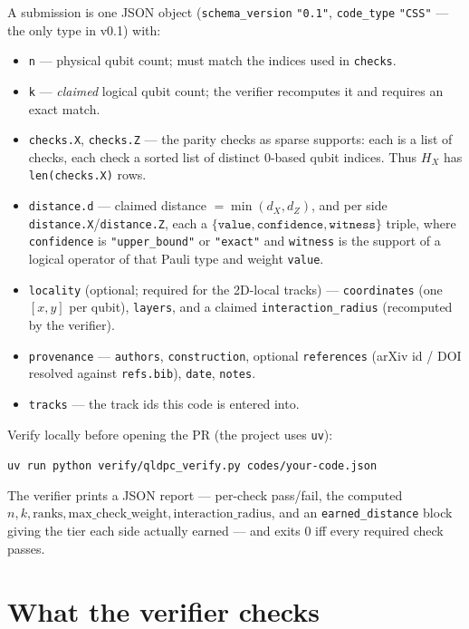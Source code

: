 \documentclass[11pt]{article}
\newcommand{\HX}{H_X}
\begin{document}
	A submission is one JSON object (\texttt{schema\_version} \texttt{"0.1"},
	\texttt{code\_type} \texttt{"CSS"} --- the only type in v0.1) with:
	\begin{itemize}[nosep]
		\item \texttt{n} --- physical qubit count; must match the indices used
		in \texttt{checks}.
		\item \texttt{k} --- \emph{claimed} logical qubit count; the verifier
		recomputes it and requires an exact match.
		\item \texttt{checks.X}, \texttt{checks.Z} --- the parity checks as
		sparse supports: each is a list of checks, each check a sorted list of
		distinct $0$-based qubit indices. Thus $\HX$ has \texttt{len(checks.X)}
		rows.
		\item \texttt{distance.d} --- claimed distance $=\min(d_X,d_Z)$, and per
		side \texttt{distance.X}/\texttt{distance.Z}, each a
		$\{\texttt{value},\texttt{confidence},\texttt{witness}\}$ triple, where
		\texttt{confidence} is \texttt{"upper\_bound"} or \texttt{"exact"} and
		\texttt{witness} is the support of a logical operator of that Pauli type
		and weight \texttt{value}.
		\item \texttt{locality} (optional; required for the 2D-local tracks) ---
		\texttt{coordinates} (one $[x,y]$ per qubit), \texttt{layers}, and a
		claimed \texttt{interaction\_radius} (recomputed by the verifier).
		\item \texttt{provenance} --- \texttt{authors}, \texttt{construction},
		optional \texttt{references} (arXiv id / DOI resolved against
		\texttt{refs.bib}), \texttt{date}, \texttt{notes}.
		\item \texttt{tracks} --- the track ids this code is entered into.
	\end{itemize}
	Verify locally before opening the PR (the project uses \texttt{uv}):
	\begin{center}
		\texttt{uv run python verify/qldpc\_verify.py codes/your-code.json}
	\end{center}
	The verifier prints a JSON report --- per-check pass/fail, the computed
	$n,k,\text{ranks},\text{max\_check\_weight},\text{interaction\_radius}$, and
	an \texttt{earned\_distance} block giving the tier each side actually earned
	--- and exits $0$ iff every required check passes.

	\section{What the verifier checks}
	\label{sec:checks}
\end{document}
